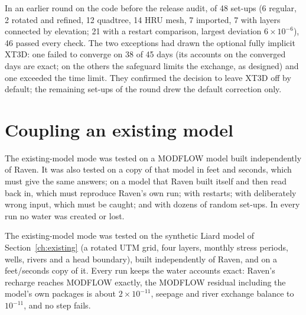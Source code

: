 In an earlier round on the code before the release audit, of 48 set-ups (6 regular, 2 rotated and refined, 12 quadtree, 14 HRU mesh, 7 imported, 7 with layers connected by
elevation; 21 with a restart comparison, largest deviation $6\times10^{-6}$), 46 passed every check. The two exceptions had
drawn the optional fully implicit XT3D: one failed to converge on 38 of 45 days (its accounts on the converged days are
exact; on the others the safeguard limits the exchange, as designed) and one exceeded the time limit. They confirmed the
decision to leave XT3D off by default; the remaining set-ups of the round drew the default correction only.

\section{Coupling an existing model}\label{sec:vexisting}
\begin{plain}
The existing-model mode was tested on a MODFLOW model built independently of Raven. It was also tested on a copy of that
model in feet and seconds, which must give the same answers; on a model that Raven built itself and then read back in, which
must reproduce Raven's own run; with restarts; with deliberately wrong input, which must be caught; and with dozens of
random set-ups. In every run no water was created or lost.
\end{plain}
The existing-model mode was tested on the synthetic Liard model of Section~\ref{ch:existing} (a rotated UTM grid, four
layers, monthly stress periods, wells, rivers and a head boundary), built independently of Raven, and on a feet/seconds copy
of it. Every run keeps the water accounts exact: Raven's recharge reaches MODFLOW exactly, the MODFLOW residual including the
model's own packages is about $2\times10^{-11}$, seepage and river exchange balance to $10^{-11}$, and no step fails.

